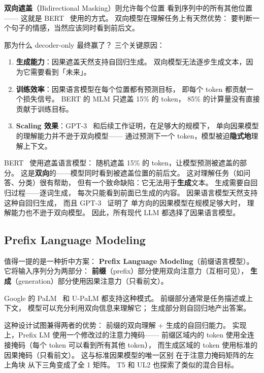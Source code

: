 \textbf{双向遮盖}（Bidirectional Masking）则允许每个位置
看到序列中的所有其他位置——
这就是 BERT~\cite{devlin2019bert} 使用的方式。
双向模型在理解任务上有天然优势：
要判断一个句子的情感，当然应该同时看到前后文。

那为什么 decoder-only 最终赢了？
三个关键原因：
\begin{enumerate}[noitemsep]
  \item \textbf{生成能力}：因果遮盖天然支持自回归生成。
        双向模型无法逐步生成文本，因为它需要看到「未来」。
  \item \textbf{训练效率}：因果语言模型在每个位置都有预测目标，
        即每个 token 都贡献一个损失信号。
        BERT 的 MLM 只遮盖 15\% 的 token，
        85\% 的计算量没有直接贡献于训练目标。
  \item \textbf{Scaling 效果}：GPT-3~\cite{brown2020gpt3}
        和后续工作证明，在足够大的规模下，
        单向因果模型的理解能力并不逊于双向模型——
        通过预测下一个 token，模型被迫\textbf{隐式地}理解上下文。
\end{enumerate}

\begin{whybox}
BERT~\cite{devlin2019bert} 使用遮盖语言模型：
随机遮盖 15\% 的 token，让模型预测被遮盖的部分。
这是\textbf{双向}的——模型同时看到被遮盖位置的前后文。
这对理解任务（如问答、分类）很有帮助，
但有一个致命缺陷：它无法用于\textbf{生成}文本。
生成需要自回归过程——逐词生成，
每次只能看到前面已生成的内容。
因果语言模型天然支持这种自回归生成，
而且 GPT-3~\cite{brown2020gpt3} 证明了
单方向的因果模型在规模足够大时，
理解能力也不逊于双向模型。
因此，所有现代 LLM 都选择了因果语言模型。
\end{whybox}

\subsection{Prefix Language Modeling}

值得一提的是一种折中方案：
\textbf{Prefix Language Modeling}（前缀语言模型）。
它将输入序列分为两部分：
\textbf{前缀}（prefix）部分使用双向注意力（互相可见），
\textbf{生成}（generation）部分使用因果注意力（只看前文）。

Google 的 PaLM~\cite{chowdhery2022palm} 和 U-PaLM 都支持这种模式。
前缀部分通常是任务描述或上下文，
模型可以充分利用双向信息来理解它；
生成部分则自回归地产出答案。

这种设计试图兼得两者的优势：
前缀的双向理解 + 生成的自回归能力。
实现上，Prefix LM 使用一个修改过的注意力掩码——
前缀区域内的 token 使用全连接掩码（每个 token 可以看到所有其他 token），
而生成区域的 token 使用标准的因果掩码（只看前文）。
这与标准因果模型的唯一区别
在于注意力掩码矩阵的左上角块
从下三角变成了全 1 矩阵。
T5 和 UL2 也探索了类似的混合目标。

